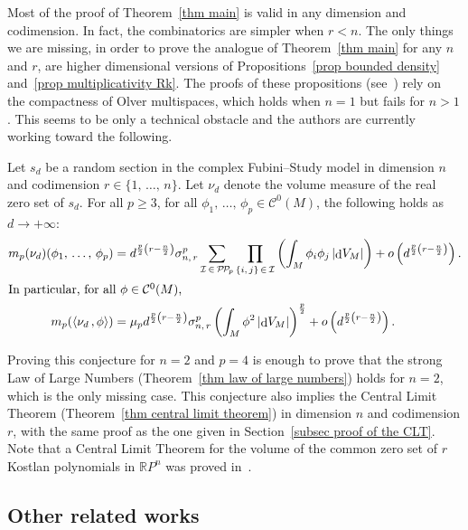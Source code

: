 \documentclass[AHL,Unicode,longabstracts,published]{cedram}
\DeclareMathOperator{\dmesure}{d}
\newcommand{\I}{\mathcal{I}}
\newcommand{\clC}{\mathcal{C}}
\newcommand{\pp}{\mathcal{P\!P}\!}
\newcommand{\R}{\mathbb{R}}
\newcommand{\norm}[1]{\left\lvert #1 \right\rvert}
\newcommand{\prsc}[2]{\left\langle #1\,, #2 \right\rangle}
\newcommand{\rmes}[1]{\norm{\dmesure\! V_{#1}}}
\renewcommand{\geq}{\geqslant}
\begin{document}
Most of the proof of Theorem~\ref{thm main} is valid in any dimension and codimension. In fact, the combinatorics are simpler when $r<n$. The only things we are missing, in order to prove the analogue of Theorem~\ref{thm main} for any $n$ and $r$, are higher dimensional versions of Propositions~\ref{prop bounded density} and~\ref{prop multiplicativity Rk}. The proofs of these propositions (see~\cite{Anc2019}) rely on the compactness of Olver multispaces, which holds when $n=1$ but fails for $n>1$. This seems to be only a technical obstacle and the authors are currently working toward the following.

\begin{conj}
Let $s_d$ be a random section in the complex Fubini--Study model in dimension $n$ and codimension $r \in \{1,\,\dots,\,n\}$. Let $\nu_d$ denote the volume measure of the real zero set of $s_d$. For all $p \geq 3$, for all $\phi_1,\,\dots,\,\phi_p \in \clC^0(M)$, the following holds as $d \to +\infty$:
\begin{align*}
m_p(\nu_d)(\phi_1,\,\dots,\,\phi_p) &= d^{\frac{p}{2}\left(r-\frac{n}{2}\right)}\sigma_{n,\,r}^p \sum_{\I\,\in\,\pp_p} \prod_{\{i,\,j\}\,\in\,\I} \left(\int_M \phi_i\phi_j \rmes{M}\right) + o\left(d^{\frac{p}{2}\left(r-\frac{n}{2}\right)}\right).
\\
\intertext{In particular, for all $\phi \in \clC^0(M)$,}
m_p(\prsc{\nu_d}{\phi}) &= \mu_p d^{\frac{p}{2}\left(r-\frac{n}{2}\right)}\sigma_{n,\,r}^p \left(\int_M \phi^2 \rmes{M}\right)^\frac{p}{2} + o\left(d^{\frac{p}{2}\left(r-\frac{n}{2}\right)}\right).
\end{align*}
\end{conj}

Proving this conjecture for $n=2$ and $p=4$ is enough to prove that the strong Law of Large Numbers (Theorem~\ref{thm law of large numbers}) holds for $n=2$, which is the only missing case. This conjecture also implies the Central Limit Theorem (Theorem~\ref{thm central limit theorem}) in dimension $n$ and codimension $r$, with the same proof as the one given in Section~\ref{subsec proof of the CLT}. Note that a Central Limit Theorem for the volume of the common zero set of $r$ Kostlan polynomials in $\R P^n$ was proved in~\cite{AADL2018a,AADL2018b}.


\subsection{Other related works}
\end{document}
